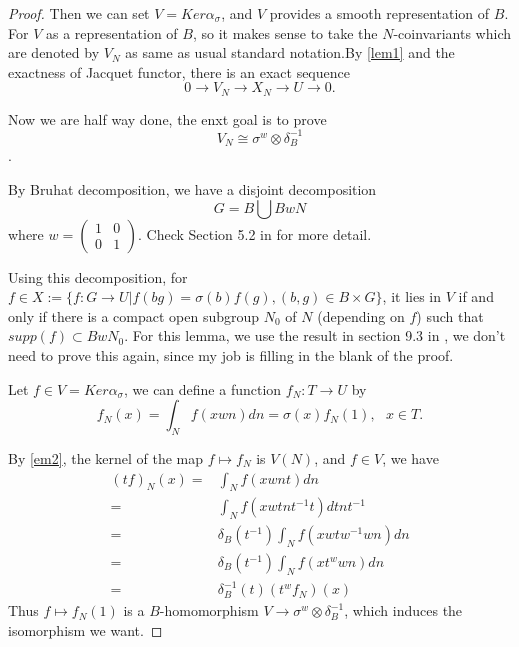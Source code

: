\documentclass[12pt,a4paper,english]{article}
\theoremstyle{plain}
\theoremstyle{definition}
\begin{document}
\begin{proof}
Then we can set $V=Ker\alpha_{\sigma}$, and $V$ provides a smooth representation of $B$. For $V$ as a representation of $B$, so it makes sense to take the $N$-coinvariants which are denoted by $V_{N}$ as same as usual standard notation.By \ref{lem1} and the exactness of Jacquet functor, there is an exact sequence
\begin{equation*}
    0\rightarrow V_{N}\rightarrow X_{N}\rightarrow U\rightarrow0.
\end{equation*}

Now we are half way done, the enxt goal is to prove $$V_{N}\cong \sigma^{w}\otimes\delta^{-1}_{B}$$.

By Bruhat decomposition, we have a disjoint decomposition
\begin{equation*}
    G=B\bigcup BwN
\end{equation*}
where $w=
    \begin{pmatrix} 1 & 0\\ 0 & 1 \end{pmatrix}.$ Check Section 5.2 in \cite{bushnell2006local} for more detail.
    
Using this decomposition,    for $f\in     X:=\{f:G\rightarrow U| f(bg)=\sigma(b)f(g), (b,g)\in B\times G  \}$, it lies in $V$ if and only if there is a compact open subgroup $N_{0}$ of $N$ (depending on $f$) such that $supp(f)\subset BwN_{0}$. For this lemma, we use the result in section 9.3 in \cite{bushnell2006local}, we don't need to prove this again, since my job is filling in the blank of the proof.

Let $f\in V=Ker\alpha_{\sigma}$, we can define a function $f_{N}: T\rightarrow U$ by 
\begin{equation*}
    f_{N}(x)=\int_{N}f(xwn)dn=\sigma(x)f_{N}(1),\ \ \ x\in T.
\end{equation*}

By \ref{em2}, the kernel of the map $f\mapsto f_{N}$ is $V(N)$, and $f\in V$, we have
\begin{align*}
    (tf)_{N}(x)=&\int_{N} f(xwnt)dn \\
    =& \int_{N}f(xwtnt^{-1}t)dtnt^{-1}\\
    =& \delta_{B}(t^{-1})\int_{N}f(xwtw^{-1}wn)dn\\
    =& \delta_{B}(t^{-1})\int_{N}f(xt^{w}wn)dn \\
    =& \delta^{-1}_{B}(t)(t^{w}f_{N})(x)
\end{align*}
Thus $f\mapsto f_{N}(1)$ is a $B$-homomorphism $V\rightarrow \sigma^{w}\otimes\delta_{B}^{-1}$, which induces the isomorphism we want.







\end{proof}




\newpage


\end{document}
